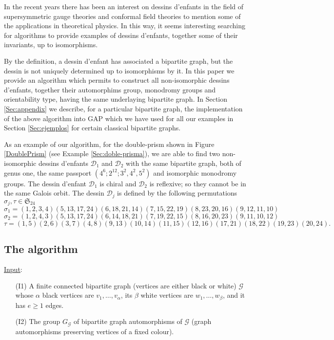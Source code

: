 \documentclass[12pt]{amsart}
\theoremstyle{remark}
\begin{document}
In the recent years there has been an interest on 
dessins d'enfants in the field of supersymmetric gauge theories \cite{ACD1,ACD2,He-R,JRR} and conformal field theories \cite{Ha-He,Je-Ra} to mention some of the applications in theoretical physics. In this way, it seems interesting searching for algorithms to provide examples of dessins d'enfants, together some of their invariants, up to isomorphisms.

By the definition, a dessin d'enfant has associated a bipartite graph, but the dessin is not uniquely determined up to isomorphisms by it. In this paper we provide an algorithm which permits to construct all  non-isomorphic dessins d'enfants, together their automorphims group, monodromy groups and orientability type, having the same underlaying bipartite graph.  In Section \ref{Sec:appendix} we describe, for a particular bipartite graph, the implementation of the above algorithm into GAP \cite{GAP} which we have used for all our examples in 
Section \ref{Sec:ejemplos}  for certain classical bipartite graphs. 

As an example of our algorithm, for the 
 double-prism shown in Figure \ref{DoublePrism} (see Example \ref{Sec:doble-prisma}), we are able to find two non-isomorphic dessins d'enfants ${\mathcal D}_{1}$ and ${\mathcal D}_{2}$ with the same bipartite graph, both of genus one, the same passport $(4^6;2^{12};3^2,4^2,5^2)$ and isomorphic monodromy groups.  The dessin d'enfant ${\mathcal D}_{1}$ is chiral and ${\mathcal D}_{2}$ is reflexive; so they cannot be in the same Galois orbit.
The dessin ${\mathcal D}_{j}$ is defined by the following permutations $\sigma_{j}, \tau \in {\mathfrak S}_{24}$ 
$$\sigma_{1}=(1,2,3,4)(5,13,17,24)(6,18,21,14)(7,15,22,19)(8,23,20,16)(9,12,11,10)$$
$$\sigma_{2}=(1,2,4,3)(5,13,17,24)(6,14,18,21)(7,19,22,15)(8,16,20,23)
(9,11,10,12)$$
$$\tau=(1,5)(2,6)(3,7)(4,8)(9,13)(10,14)(11,15)(12,16)(17,21)(18,22)
(19,23)(20,24).$$

\subsection*{The algorithm}
\mbox{}

\underline{Input}:
\begin{enumerate}
\item[(I1)] A finite connected bipartite graph (vertices are either black or white) ${\mathcal G}$ whose  
$\alpha$ black vertices are $v_{1},\ldots,v_{\alpha}$, its $\beta$ white vertices are $w_{1},\ldots,w_{\beta}$,  and it has $e \geq 1$ edges. 
\item[(I2)] The group $G_{\mathcal G}$ of bipartite graph automorphisms of ${\mathcal G}$ (graph automorphisms preserving vertices of a fixed colour). 
\end{enumerate}
\end{document}
